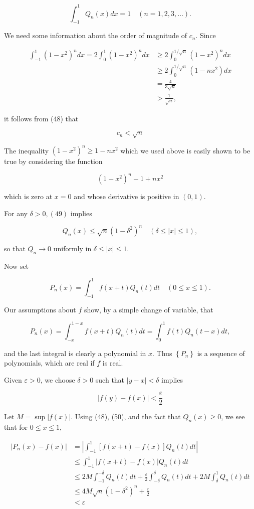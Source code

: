 \documentclass[10pt]{article}
\begin{document}
$$
\int_{-1}^{1} Q_{n}(x) d x=1 \quad(n=1,2,3, \ldots) .
$$

We need some information about the order of magnitude of $c_{n}$. Since

$$
\begin{aligned}
\int_{-1}^{1}\left(1-x^{2}\right)^{n} d x=2 \int_{0}^{1}\left(1-x^{2}\right)^{n} d x & \geq 2 \int_{0}^{1 / \sqrt{n}}\left(1-x^{2}\right)^{n} d x \\
& \geq 2 \int_{0}^{1 / \sqrt{n}}\left(1-n x^{2}\right) d x \\
& =\frac{4}{3 \sqrt{n}} \\
& >\frac{1}{\sqrt{n}},
\end{aligned}
$$

it follows from (48) that

$$
c_{n}<\sqrt{n}
$$

The inequality $\left(1-x^{2}\right)^{n} \geq 1-n x^{2}$ which we used above is easily shown to be true by considering the function

$$
\left(1-x^{2}\right)^{n}-1+n x^{2}
$$

which is zero at $x=0$ and whose derivative is positive in $(0,1)$.

For any $\delta>0,(49)$ implies

$$
Q_{n}(x) \leq \sqrt{n}\left(1-\delta^{2}\right)^{n} \quad(\delta \leq|x| \leq 1),
$$

so that $Q_{n} \rightarrow 0$ uniformly in $\delta \leq|x| \leq 1$.

Now set

$$
P_{n}(x)=\int_{-1}^{1} f(x+t) Q_{n}(t) d t \quad(0 \leq x \leq 1) .
$$

Our assumptions about $f$ show, by a simple change of variable, that

$$
P_{n}(x)=\int_{-x}^{1-x} f(x+t) Q_{n}(t) d t=\int_{0}^{1} f(t) Q_{n}(t-x) d t,
$$

and the last integral is clearly a polynomial in $x$. Thus $\left\{P_{n}\right\}$ is a sequence of polynomials, which are real if $f$ is real.

Given $\varepsilon>0$, we choose $\delta>0$ such that $|y-x|<\delta$ implies

$$
|f(y)-f(x)|<\frac{\varepsilon}{2}
$$

Let $M=\sup |f(x)|$. Using (48), (50), and the fact that $Q_{n}(x) \geq 0$, we see that for $0 \leq x \leq 1$,

$$
\begin{aligned}
\left|P_{n}(x)-f(x)\right| & =\left|\int_{-1}^{1}[f(x+t)-f(x)] Q_{n}(t) d t\right| \\
& \leq \int_{-1}^{1}|f(x+t)-f(x)| Q_{n}(t) d t \\
& \leq 2 M \int_{-1}^{-\delta} Q_{n}(t) d t+\frac{\varepsilon}{2} \int_{-\delta}^{\delta} Q_{n}(t) d t+2 M \int_{\delta}^{1} Q_{n}(t) d t \\
& \leq 4 M \sqrt{n}\left(1-\delta^{2}\right)^{n}+\frac{\varepsilon}{2} \\
& <\varepsilon
\end{aligned}
$$
\end{document}
